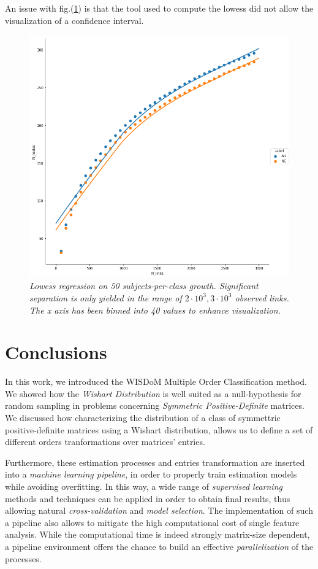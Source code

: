 \documentclass[12pt,openright,twoside,a4paper]{book}
\begin{document}
An issue with fig.(\ref{ADNI-lowess}) is that the tool used to compute the lowess did not allow the visualization of a confidence interval.

\begin{figure}[!h]
\centering
\includegraphics[scale=0.4]{ADNI-lowess}
\caption{\textit{Lowess regression on 50 subjects-per-class growth. Significant separation is only yielded in the range of $2\cdot 10^3,3\cdot 10^3$ observed links. The x axis has been binned into 40 values to enhance visualization.}}
\label{ADNI-lowess}
\end{figure}


\backmatter


\chapter{Conclusions}

In this work, we introduced the WISDoM Multiple Order Classification method.
We showed how the \textit{Wishart Distribution} is well suited as a null-hypothesis for random sampling in problems concerning \textit{Symmetric Positive-Definite} matrices.
We discussed how characterizing the distribution of a class of symmettric positive-definite matrices using a Wishart distribution, allows us to define a set of different orders tranformations over matrices' entries.

Furthermore, these estimation processes and entries transformation are inserted into a \textit{machine learning pipeline}, in order to properly train estimation models while avoiding overfitting.
In this way, a wide range of \textit{supervised learning} methods and techniques can be applied in order to obtain final results, thus allowing natural \textit{cross-validation} and \textit{model selection}.
The implementation of such a pipeline also allows to mitigate the high computational cost of single feature analysis.
While the computational time is indeed strongly matrix-size dependent, a pipeline environment offers the chance to build an effective \textit{parallelization} of the processes.
\end{document}
